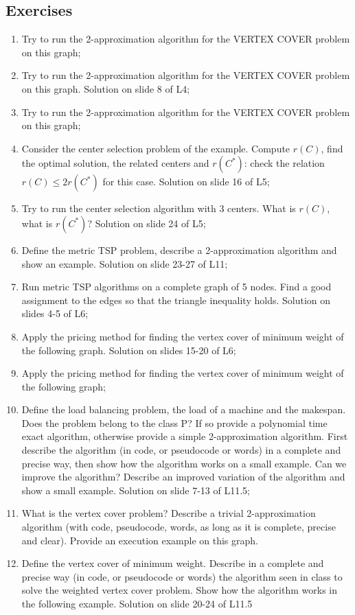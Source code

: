 \subsection{Exercises}
\begin{enumerate}
    \item Try to run the 2-approximation algorithm for the VERTEX COVER problem on this graph; 
    \item Try to run the 2-approximation algorithm for the VERTEX COVER problem on this graph. Solution on slide 8 of L4; 
    \item Try to run the 2-approximation algorithm for the VERTEX COVER problem on this graph;
    \item Consider the center selection problem of the example. Compute $r(C)$, find the optimal solution, the related centers and $r(C^*)$: check the relation $r(C) \leq 2r(C^*)$ for this case. Solution on slide 16 of L5;
    \item Try to run the center selection algorithm with 3 centers. What is $r(C)$, what is $r(C^*)$? Solution on slide 24 of L5; 
    \item Define the metric TSP problem, describe a 2-approximation algorithm and show an example. Solution on slide 23-27 of L11;
    \item Run metric TSP algorithms on a complete graph of 5 nodes. Find a good assignment to the edges so that the triangle inequality holds. Solution on slides 4-5 of L6;
    \item Apply the pricing method for finding the vertex cover of minimum weight of the following graph. Solution on slides 15-20 of L6; 
    \item Apply the pricing method for finding the vertex cover of minimum weight of the following graph; 
    \item Define the load balancing problem, the load of a machine and the makespan. Does the problem belong to the class P? If so provide a polynomial time exact algorithm, otherwise provide a simple 2-approximation algorithm. First describe the algorithm (in code, or pseudocode or words) in a complete and precise way, then show how the algorithm works on a small example. Can we improve the algorithm? Describe an improved variation of the algorithm and show a small example. Solution on slide 7-13 of L11.5;
    \item What is the vertex cover problem? Describe a trivial 2-approximation algorithm (with code, pseudocode, words, as long as it is complete, precise and clear). Provide an execution example on this graph.
    \item Define the vertex cover of minimum weight. Describe in a complete and precise way (in code, or pseudocode or words) the algorithm seen in class to solve the weighted vertex cover problem. Show how the algorithm works in the following example. Solution on slide 20-24 of L11.5
\end{enumerate}
